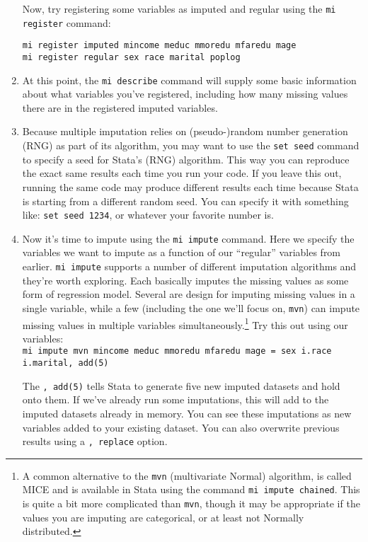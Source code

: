 \documentclass[a4paper,12pt]{article}
\begin{document}
\begin{enumerate}
Now, try registering some variables as imputed and regular using the \texttt{mi register} command:
\begin{verbatim}
mi register imputed mincome meduc mmoredu mfaredu mage
mi register regular sex race marital poplog
\end{verbatim}

\item At this point, the \texttt{mi describe} command will supply some basic information about what variables you've registered, including how many missing values there are in the registered imputed variables.

\item Because multiple imputation relies on (pseudo-)random number generation (RNG) as part of its algorithm, you may want to use the \texttt{set seed} command to specify a seed for Stata's (RNG) algorithm. This way you can reproduce the exact same results each time you run your code. If you leave this out, running the same code may produce different results each time because Stata is starting from a different random seed. You can specify it with something like: \texttt{set seed 1234}, or whatever your favorite number is.

\item Now it's time to impute using the \texttt{mi impute} command. Here we specify the variables we want to impute as a function of our ``regular'' variables from earlier. \texttt{mi impute} supports a number of different imputation algorithms and they're worth exploring. Each basically imputes the missing values as some form of regression model. Several are design for imputing missing values in a single variable, while a few (including the one we'll focus on, \texttt{mvn}) can impute missing values in multiple variables simultaneously.\footnote{A common alternative to the \texttt{mvn} (multivariate Normal) algorithm, is called MICE and is available in Stata using the command \texttt{mi impute chained}. This is quite a bit more complicated than \texttt{mvn}, though it may be appropriate if the values you are imputing are categorical, or at least not Normally distributed.} Try this out using our variables:\\
\texttt{mi impute mvn mincome meduc mmoredu mfaredu mage = sex i.race i.marital, add(5)}

The \texttt{, add(5)} tells Stata to generate five new imputed datasets and hold onto them. If we've already run some imputations, this will add to the imputed datasets already in memory. You can see these imputations as new variables added to your existing dataset. You can also overwrite previous results using a \texttt{, replace} option.


\end{enumerate}
\end{document}
